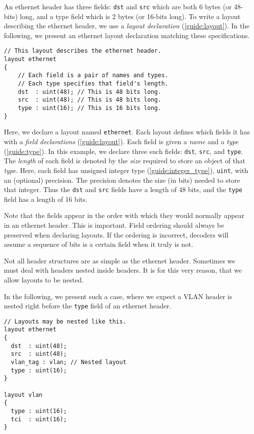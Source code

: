 An ethernet header has three fields: \texttt{dst} and \texttt{src} which are both 6 bytes (or 48-bits) long, and a type field which is 2 bytes (or 16-bits long). To write a layout describing the ethernet header, we use a \textit{layout declaration} (\ref{guide:layout}). In the following, we present an ethernet layout declaration matching these specifications.

\begin{codepage}
\begin{lstlisting}
// This layout describes the ethernet header.
layout ethernet
{
	// Each field is a pair of names and types.
	// Each type specifies that field's length.
	dst  : uint(48); // This is 48 bits long.
	src  : uint(48); // This is 48 bits long.
	type : uint(16); // This is 16 bits long.
}
\end{lstlisting}
\end{codepage}

Here, we declare a layout named \texttt{ethernet}. Each layout defines which fields it has with a \textit{field declarations} (\ref{guide:layout}). Each field is given a \textit{name} and a \textit{type} (\ref{guide:type}). In this example, we declare three such fields: \texttt{dst}, \texttt{src}, and \texttt{type}. The \textit{length} of each field is denoted by the \textit{size} required to store an object of that \textit{type}. Here, each field has unsigned integer type (\ref{guide:integer_type}), \texttt{uint}, with an (optional) precision. The precision denotes the size (in bits) needed to store that integer. Thus the \texttt{dst} and \texttt{src} fields have a length of 48 bits, and the \texttt{type} field has a length of 16 bits. 

Note that the fields appear in the order with which they would normally appear in an ethernet header. This is important. Field ordering should always be preserved when declaring layouts. If the ordering is incorrect, decoders will assume a sequence of bits is a certain field when it truly is not.

Not all header structures are as simple as the ethernet header. Sometimes we must deal with headers nested inside headers. It is for this very reason, that we allow layouts to be nested. 

In the following, we present such a case, where we expect a VLAN header \cite{vlan_std} is nested right before the \texttt{type} field of an ethernet header. 

\begin{codepage}
\begin{lstlisting}
// Layouts may be nested like this.
layout ethernet
{
  dst  : uint(48);
  src  : uint(48);
  vlan_tag : vlan; // Nested layout
  type : uint(16);
}

layout vlan
{
  type : uint(16);
  tci  : uint(16);
}
\end{lstlisting}
\end{codepage}

